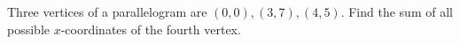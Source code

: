Three vertices of a parallelogram are $(0,0),(3,7),(4,5)$. Find the sum of all possible $x$-coordinates of the fourth vertex.
